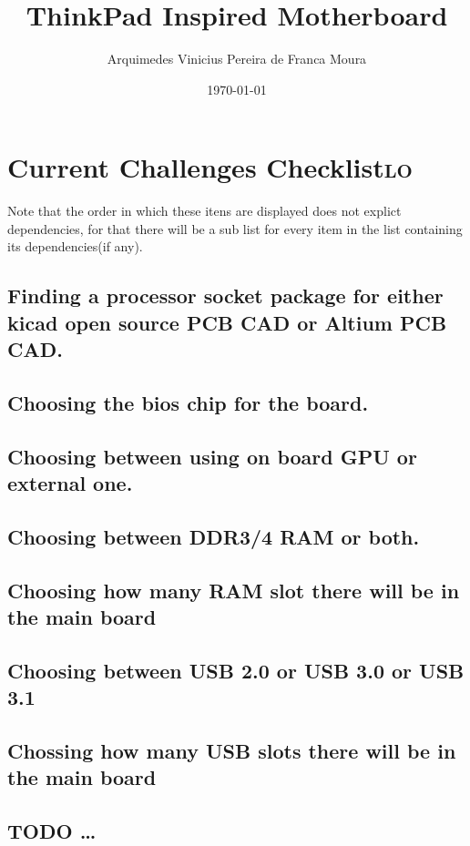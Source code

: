 \documentclass[11pt]{article}
\author{Arquimedes Vinicius Pereira de Franca Moura}
\date{\today}
\title{ThinkPad Inspired Motherboard}
\begin{document}
\maketitle
\tableofcontents

\section{Current Challenges Checklist\hfill{}\textsc{lo}}
\label{sec:orgf8b7fd9}
Note that the order in which these itens are displayed does not explict dependencies, for that there will be a sub list for every item in the list containing its dependencies(if any).
\subsection{Finding a processor socket package for either kicad open source PCB CAD or Altium PCB CAD.}
\label{sec:org345a9a4}
\subsection{Choosing the bios chip for the board.}
\label{sec:orgb1fc3a6}
\subsection{Choosing between using on board GPU or external one.}
\label{sec:org61e8bb1}
\subsection{Choosing between DDR3/4 RAM or both.}
\label{sec:org868cffe}
\subsection{Choosing how many RAM slot there will be in the main board}
\label{sec:org96ffd18}
\subsection{Choosing between USB 2.0 or USB 3.0 or USB 3.1}
\label{sec:org17a3779}
\subsection{Chossing how many USB slots there will be in the main board}
\label{sec:orgbddeff2}
\subsection{{\bfseries\sffamily TODO} \ldots{}}
\label{sec:orga5e5c32}
\end{document}
